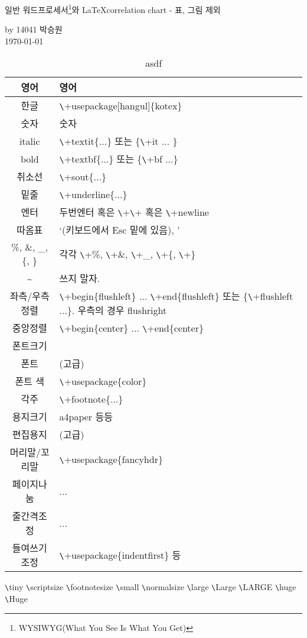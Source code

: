 \documentclass[11pt]{article}
\begin{document}
	\begin{center}
		\Large 일반 워드프로세서\footnote{WYSIWYG(What You See Is What You Get)}와 \LaTeX correlation chart - 표, 그림 제외
	\end{center}
	\begin{flushright}
		by 14041 박승원 \\
		\today
	\end{flushright}
\begin{table}[h]
	\centering
	\begin{tabular}{|c|l|}
		\hline
		영어 & 영어 \\
		\hline
		한글 & \verb+\+usepackage[hangul]\{kotex\} \\
		\hline
		숫자 & 숫자 \\
		\hline
		italic & \verb+\+textit\{...\} 또는 \{\verb+\+it ... \} \\
		\hline
		bold & \verb+\+textbf\{...\} 또는 \{\verb+\+bf ...\} \\
		\hline
		취소선 & \verb+\+sout\{...\} \\
		\hline
		밑줄 & \verb+\+underline\{...\} \\
		\hline
		엔터 & 두번엔터 혹은 \verb+\+\verb+\+ 혹은 \verb+\+newline \\
		\hline
		따옴표 & `(키보드에서 Esc 밑에 있음), ' \\
		\hline
		\%, \&, \_, \{, \} & 각각 \verb+\+\%, \verb+\+\&, \verb+\+\_, \verb+\+\{, \verb+\+\} \\
		\hline
		\~{} & 쓰지 말자. \\
		\hline
		좌측/우측정렬 & \verb+\+begin\{flushleft\} ... \verb+\+end\{flushleft\} 또는 \{\verb+\+flushleft ...\}. 우측의 경우 flushright \\
		\hline
		중앙정렬 & \verb+\+begin\{center\} ... \verb+\+end\{center\} \\
		\hline
		폰트크기 &  \\
		\hline
		폰트 & (고급) \\
		\hline
		폰트 색 & \verb+\+usepackage\{color\} \\
		\hline
		각주 & \verb+\+footnote\{...\} \\
		\hline
		용지크기 & a4paper 등등 \\
		\hline
		편집용지 & (고급) \\
		\hline
		머리말/꼬리말 & \verb+\+usepackage\{fancyhdr\} \\
		\hline
		페이지나눔 & ... \\
		\hline
		줄간격조정 & ... \\
		\hline
		들여쓰기 조정 & \verb+\+usepackage\{indentfirst\} 등 \\
		\hline
	\end{tabular}
	\caption{asdf}
	\label{asdf}
\end{table}
{\tiny \verb+\+tiny} {\scriptsize \verb+\+scriptsize} {\footnotesize \verb+\+footnotesize} {\small \verb+\+small} {\normalsize \verb+\+normalsize} {\large \verb+\+large} {\Large \verb+\+Large} {\LARGE \verb+\+LARGE} {\huge \verb+\+huge} {\Huge \verb+\+Huge}
\end{document}
